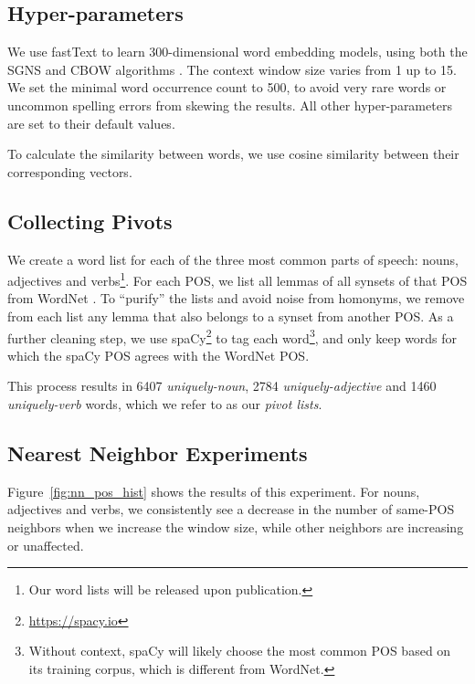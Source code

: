 \documentclass[11pt,a4paper]{article}
\begin{document}
    \subsection{Hyper-parameters}\label{sec:hyperparams}
    We use fastText \cite{bojanowski2016enriching} to learn
    300-dimensional word embedding models,
    using both the SGNS and CBOW algorithms \cite{mikolov2013efficient}.
    The context window size varies from 1 up to 15.
    We set the minimal word occurrence count to 500, to avoid
    very rare words or uncommon spelling errors from skewing the results.
    All other hyper-parameters are set to their default values.
    
    To calculate the similarity between words, we use cosine similarity
    between their corresponding vectors.
    	
    \subsection{Collecting Pivots}\label{sec:pivots}
    
    We create a word list for each of the three most
    common parts of speech:
    nouns, adjectives and verbs\footnote{Our word lists will be released upon publication.}.
    For each POS, we list all lemmas of all synsets of that POS from
    WordNet \cite{miller1998wordnet}.
    To ``purify'' the lists and avoid noise from homonyms,
    we remove from each list any lemma that also belongs to a synset from
    another POS.
    As a further cleaning step, we use spaCy\footnote{\url{https://spacy.io}}
    to tag each word\footnote{Without context, spaCy will likely choose the most
    common POS based on its training corpus, which is different from WordNet.},
    and only keep words for which the spaCy POS agrees with the WordNet POS.
    
    This process results in 6407 \textit{uniquely-noun}, 2784 \textit{uniquely-adjective}
    and 1460 \textit{uniquely-verb} words, which we refer to as our \textit{pivot lists}.
    
    \subsection{Nearest Neighbor Experiments}\label{sec:nn_exp}
    
    Figure~\ref{fig:nn_pos_hist} shows the results of this experiment.
    For nouns, adjectives and verbs, we consistently see a decrease in
    the number of same-POS neighbors when we increase the window size,
    while other neighbors are increasing or unaffected.
    
\end{document}
